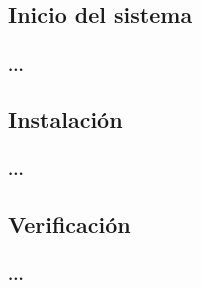 \documentclass[12pt]{article}
\begin{document}
\subsection*{Inicio del sistema}
\subsubsection*{...}

\subsection*{Instalación}
\subsubsection*{...}

\subsection*{Verificación}
\subsubsection*{...}
\end{document}
